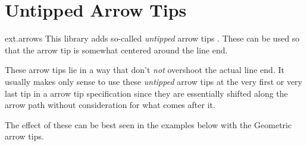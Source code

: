 %
%
%

\section{Untipped Arrow Tips}
\label{pgflibrary:arrows}

\begin{pgflibrary}{ext.arrows}
  This library adds so-called \emph{untipped} arrow tips \pgfname.
  These can be used so that the arrow tip is somewhat centered around the line end.
\end{pgflibrary}

These arrow tips lie in a way that don't \emph{not} overshoot the actual line end.
It usually makes only sense to use these \emph{untipped}
arrow tips at the very first or very last tip in a arrow tip specification
since they are essentially shifted along the arrow path without consideration for what
comes after it.

The effect of these can be best seen in the examples below with the Geometric arrow tips.


